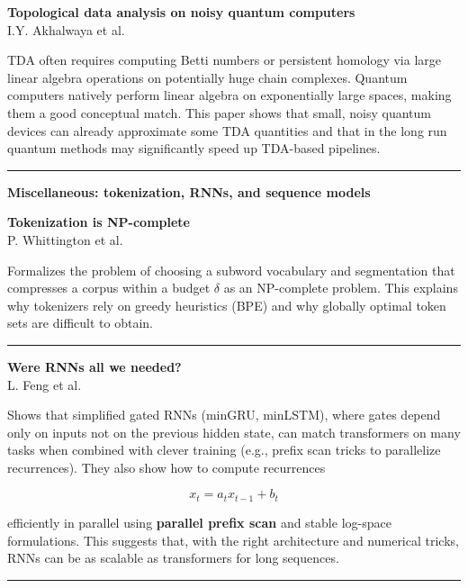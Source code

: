 \documentclass[a5paper]{article}
\def\subsection#1{{\par\bigskip\goodbreak\large\bfseries #1\par}}
\begin{document}
\textbf{Topological data analysis on noisy quantum computers}\\
I.Y. Akhalwaya et al.

TDA often requires computing Betti numbers or persistent homology via
large linear algebra operations on potentially huge chain complexes.
Quantum computers natively perform linear algebra on exponentially large
spaces, making them a good conceptual match. This paper shows that
small, noisy quantum devices can already approximate some TDA quantities
and that in the long run quantum methods may significantly speed up
TDA-based pipelines.

\begin{center}\rule{0.5\linewidth}{0.5pt}\end{center}

\subsection{Miscellaneous: tokenization, RNNs, and sequence
models}\label{miscellaneous-tokenization-rnns-and-sequence-models}

\textbf{Tokenization is NP-complete}\\
P. Whittington et al.

Formalizes the problem of choosing a subword vocabulary and segmentation
that compresses a corpus within a budget $\delta$ as an NP-complete problem.
This explains why tokenizers rely on greedy heuristics (BPE) and why
globally optimal token sets are difficult to obtain.

\begin{center}\rule{0.5\linewidth}{0.5pt}\end{center}

\textbf{Were RNNs all we needed?}\\
L. Feng et al.

Shows that simplified gated RNNs (minGRU, minLSTM), where gates depend
only on inputs not on the previous hidden state, can match transformers
on many tasks when combined with clever training (e.g., prefix scan
tricks to parallelize recurrences). They also show how to compute
recurrences

\[ x_t = a_t x_{t-1} + b_t \]

efficiently in parallel using \textbf{parallel prefix scan} and stable
log-space formulations. This suggests that, with the right architecture
and numerical tricks, RNNs can be as scalable as transformers for long
sequences.

\begin{center}\rule{0.5\linewidth}{0.5pt}\end{center}
\end{document}
